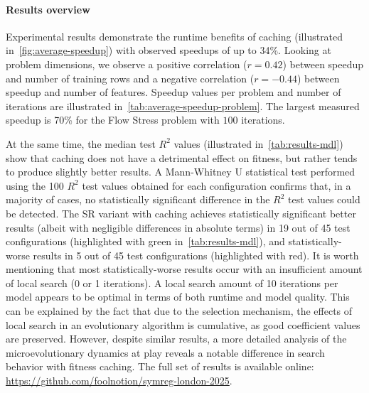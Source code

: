 \documentclass[openacc]{rstransa}%
\begin{document}
\paragraph{Results overview}

Experimental results demonstrate the runtime benefits of caching (illustrated in~\autoref{fig:average-speedup}) with observed speedups of up to 34\%. Looking at problem dimensions, we observe a positive correlation ($r=0.42$) between speedup and number of training rows and a negative correlation ($r=-0.44$) between speedup and number of features. Speedup values per problem and number of iterations are illustrated in~\autoref{tab:average-speedup-problem}. The largest measured speedup is 70\% for the Flow Stress problem with $100$ iterations.

At the same time, the median test $R^2$ values (illustrated in~\autoref{tab:results-mdl}) show that caching does not have a detrimental effect on fitness, but rather tends to produce slightly better results. A Mann-Whitney U statistical test performed using the 100 $R^2$ test values obtained for each configuration confirms that, in a majority of cases, no statistically significant difference in the $R^2$ test values could be detected. The SR variant with caching achieves statistically significant better results (albeit with negligible differences in absolute terms) in 19 out of 45 test configurations (highlighted with green in~\autoref{tab:results-mdl}), and statistically-worse results in 5 out of 45 test configurations (highlighted with red). It is worth mentioning that most statistically-worse results occur with an insufficient amount of local search (0 or 1 iterations). A local search amount of 10 iterations per model appears to be optimal in terms of both runtime and model quality. This can be explained by the fact that due to the selection mechanism, the effects of local search in an evolutionary algorithm is cumulative, as good coefficient values are preserved.
%
However, despite similar results, a more detailed analysis of the microevolutionary dynamics at play reveals a notable difference in search behavior with fitness caching. The full set of results is available online: \url{https://github.com/foolnotion/symreg-london-2025}.

\begin{table}
    \centering
    
    \caption{Impact of local search on total model evaluations computed at the end of the run. Saved effort is computed as the ratio between not cached and cached quantities.}\label{tab:local-search-impact}
\end{table}
\end{document}
